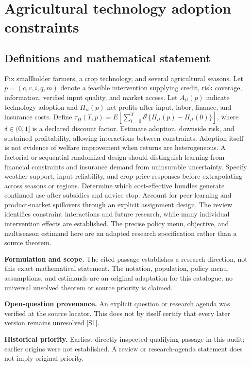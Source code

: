 \documentclass[11pt]{article}
\newcommand{\sref}[2]{\hyperlink{source:#1:#2}{[S#2]}}
\begin{document}
\section*{Agricultural technology adoption constraints}\label{30007659}
\subsection{Definitions and mathematical statement}
Fix smallholder farmers, a crop technology, and several agricultural seasons. Let \(p=(c,r,i,q,m)\) denote a feasible intervention supplying credit, risk coverage, information, verified input quality, and market access. Let \(A_{it}(p)\) indicate technology adoption and \(\Pi_{it}(p)\) net profits after input, labor, finance, and insurance costs. Define \(\tau_\Pi(T,p)=E[\sum_{t=0}^{T}\delta^t\{\Pi_{it}(p)-\Pi_{it}(0)\}]\), where \(\delta\in(0,1]\) is a declared discount factor. Estimate adoption, downside risk, and sustained profitability, allowing interactions between constraints. Adoption itself is not evidence of welfare improvement when returns are heterogeneous. A factorial or sequential randomized design should distinguish learning from financial constraints and insurance demand from uninsurable uncertainty. Specify weather support, input reliability, and crop-price responses before extrapolating across seasons or regions. Determine which cost-effective bundles generate continued use after subsidies and advice stop. Account for peer learning and product-market spillovers through an explicit assignment design. The review identifies constraint interactions and future research, while many individual intervention effects are established. The precise policy menu, objective, and multiseason estimand here are an adapted research specification rather than a source theorem.

\par\textbf{Formulation and scope.} The cited passage establishes a research direction, not this exact mathematical statement. The notation, population, policy menu, assumptions, and estimands are an original adaptation for this catalogue; no universal unsolved theorem or source priority is claimed.

\par\textbf{Open-question provenance.} An explicit question or research agenda was verified at the source locator. This does not by itself certify that every later version remains unresolved \sref{30007659}{1}.

\par\textbf{Historical priority.} Earliest directly inspected qualifying passage in this audit; earlier origins were not established. A review or research-agenda statement does not imply original priority.
\end{document}
